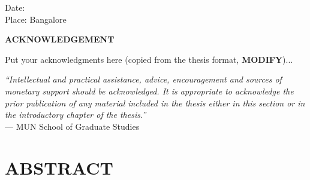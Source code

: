 \documentclass[english,a4paper,11pt]{report}
\newcommand{\precursortitle}[1]{
	\begin{center}
		\textbf{\Large #1}
	\end{center}
}
\begin{document}
	\vspace*{2cm}
	\noindent Date: \\
	\noindent Place: Bangalore \\
	
	\afterpage{\null\newpage}
	
	\newpage
	\setcounter{page}{4}
	\thispagestyle{plain}
	
	\precursortitle{\MakeUppercase{Acknowledgement}}
	\vspace{1cm}
	
	Put your acknowledgments here (copied from the thesis format, \textbf{MODIFY})...
	\vspace{1cm}
	
	\noindent\emph{``Intellectual and practical assistance, advice, encouragement and
		sources of monetary support should be acknowledged. It is appropriate to
		acknowledge the prior publication of any material included in the thesis
		either in this section or in the introductory chapter of the thesis.''}\\
	
	\hfill --- MUN School of Graduate Studies
	\clearpage
	
	\newpage
	
	\thispagestyle{plain}

	\tableofcontents
	\clearpage
	
	\newpage
	\listoftables
	
	\newpage
	\listoffigures
	
	\newpage
	\chapter*{\MakeUppercase{Abstract}}
	
\end{document}

